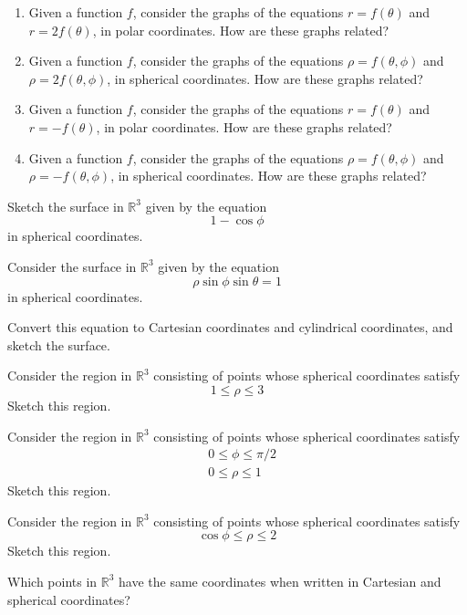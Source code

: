 \documentclass{ximera}
\begin{document}
\begin{problem}
\begin{enumerate}
\item Given a function $f$, consider the graphs of the equations $r = f(\theta)$ and $r = 2f(\theta)$, in polar coordinates. How are these graphs related?
\item Given a function $f$, consider the graphs of the equations $\rho = f(\theta, \phi)$ and $\rho = 2f(\theta, \phi)$, in spherical coordinates. How are these graphs related?
\item Given a function $f$, consider the graphs of the equations $r = f(\theta)$ and $r = -f(\theta)$, in polar coordinates. How are these graphs related?
\item Given a function $f$, consider the graphs of the equations $\rho = f(\theta, \phi)$ and $\rho = -f(\theta, \phi)$, in spherical coordinates. How are these graphs related?
\end{enumerate}
\end{problem}

\begin{problem}
Sketch the surface in $\mathbb{R}^3$ given by the equation
\[
1-\cos\phi
\]
in spherical coordinates.
\end{problem}

\begin{problem}
Consider the surface in $\mathbb{R}^3$ given by the equation
\[
\rho\sin\phi\sin\theta = 1
\]
in spherical coordinates.

Convert this equation to Cartesian coordinates and cylindrical coordinates, and sketch the surface.
\end{problem}

\begin{problem}
Consider the region in $\mathbb{R}^3$ consisting of points whose spherical coordinates satisfy
\[
1\leq\rho\leq 3
\]
Sketch this region.
\end{problem}

\begin{problem}
Consider the region in $\mathbb{R}^3$ consisting of points whose spherical coordinates satisfy
\begin{align*}
&0\leq \phi\leq \pi/2\\
&0\leq \rho\leq 1
\end{align*}
Sketch this region.
\end{problem}

\begin{problem}
Consider the region in $\mathbb{R}^3$ consisting of points whose spherical coordinates satisfy
\[
\cos\phi \leq \rho \leq 2
\]
Sketch this region.
\end{problem}

\begin{problem}
Which points in $\mathbb{R}^3$ have the same coordinates when written in Cartesian and spherical coordinates?
\end{problem}
\end{document}
